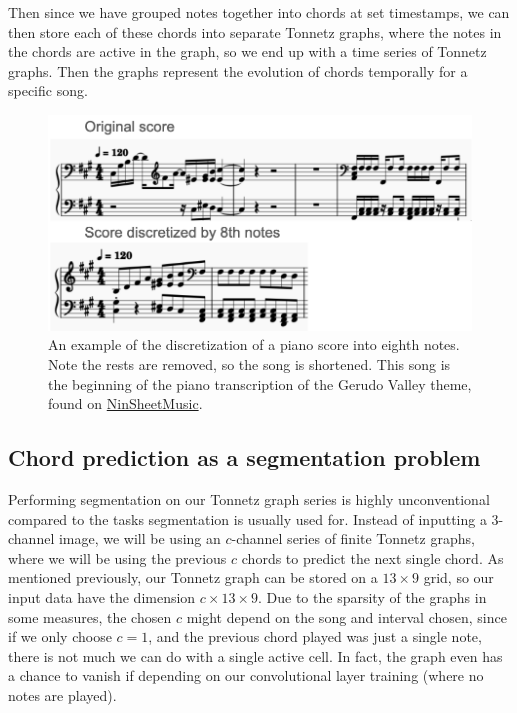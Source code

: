 \documentclass[
	a4paper, %
	10pt, %
	unnumberedsections, %
	twoside, %
]{LTJournalArticle}
\begin{document}
Then since we have grouped notes together into chords at set timestamps, we can then store each of these chords into separate Tonnetz graphs, where the notes in the chords are active in the graph, so we end up with a time series of Tonnetz graphs. Then the graphs represent the evolution of chords temporally for a specific song.

\begin{figure}
    \centering
    \includegraphics[width=\linewidth]{images/score-discrete-gerudo.png}
    \caption{An example of the discretization of a piano score into eighth notes. Note the rests are removed, so the song is shortened. This song is the beginning of the piano transcription of the Gerudo Valley theme, found on \href{https://www.ninsheetmusic.org/browse/series/TheLegendofZelda}{NinSheetMusic}.}
    \label{fig:score-discrete}
\end{figure}

\subsection{Chord prediction as a segmentation problem}

Performing segmentation on our Tonnetz graph series is highly unconventional compared to the tasks segmentation is usually used for. Instead of inputting a 3-channel image, we will be using an $c$-channel series of finite Tonnetz graphs, where we will be using the previous $c$ chords to predict the next single chord. As mentioned previously, our Tonnetz graph can be stored on a $13\times9$ grid, so our input data have the dimension $c\times13\times9$. Due to the sparsity of the graphs in some measures, the chosen $c$ might depend on the song and interval chosen, since if we only choose $c=1$, and the previous chord played was just a single note, there is not much we can do with a single active cell. In fact, the graph even has a chance to vanish if depending on our convolutional layer training (where no notes are played).
\end{document}
